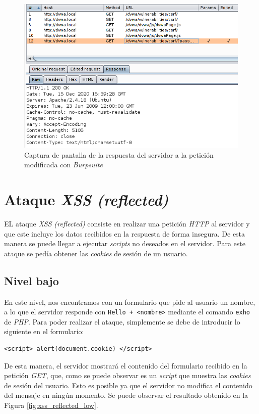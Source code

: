 \documentclass{article}
\begin{document}
\begin{figure}[h!]
    \centering
    \includegraphics[scale=0.6]{images/csrf_medium_response.png}
    \caption{Captura de pantalla de la respuesta del servidor a la petición modificada con \textit{Burpsuite}}
    \label{fig:csrf_medium_response}
\end{figure}

\newpage
\section{Ataque \textit{XSS (reflected)}}
EL ataque \textit{XSS (reflected)} consiste en realizar una petición \textit{HTTP} al servidor y que este incluye los datos recibidos en la respuesta de forma insegura. De esta manera se puede llegar a ejecutar \textit{scripts} no deseados en el servidor. Para este ataque se pedía obtener las \textit{cookies} de sesión de un usuario.
\subsection{Nivel bajo}
En este nivel, nos encontramos con un formulario que pide al usuario un nombre, a lo que el servidor responde con \texttt{Hello + <nombre>} mediante el comando \texttt{exho} de \textit{PHP}. Para poder realizar el ataque, simplemente se debe de introducir lo siguiente en el formulario:

\begin{lstlisting}
<script> alert(document.cookie) </script>
\end{lstlisting}

De esta manera, el servidor mostrará el contenido del formulario recibido en la petición \textit{GET}, que, como se puede observar es un \textit{script} que muestra las \textit{cookies} de sesión del usuario. Esto es posible ya que el servidor no modifica el contenido del mensaje en ningún momento. Se puede observar el resultado obtenido en la Figura \ref{fig:xss_reflected_low}.
\end{document}
